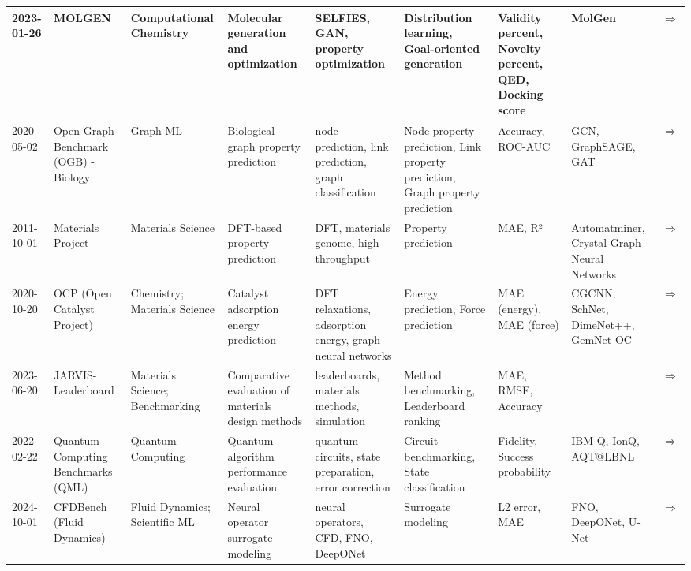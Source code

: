 \documentclass{article}
\begin{document}
\begin{landscape}
{\begin{longtable}{|p{1.5cm}|p{2.5cm}|p{2cm}|p{2cm}|p{2.5cm}|p{3cm}|p{2cm}|p{2cm}|p{1cm}|}
2023-01-26 & MOLGEN & Computational Chemistry & Molecular generation and optimization & SELFIES, GAN, property optimization & Distribution learning, Goal-oriented generation & Validity percent, Novelty percent, QED, Docking score & MolGen & \cite{fang2023domain} \href{https://arxiv.org/abs/2301.11259}{$\Rightarrow$ } \\ \hline
2020-05-02 & Open Graph Benchmark (OGB) - Biology & Graph ML & Biological graph property prediction & node prediction, link prediction, graph classification & Node property prediction, Link property prediction, Graph property prediction & Accuracy, ROC-AUC & GCN, GraphSAGE, GAT & \cite{hu2020ogb} \href{https://arxiv.org/abs/2005.00687}{$\Rightarrow$ } \\ \hline
2011-10-01 & Materials Project & Materials Science & DFT-based property prediction & DFT, materials genome, high-throughput & Property prediction & MAE, R² & Automatminer, Crystal Graph Neural Networks & \cite{jain2013materials} \href{https://materialsproject.org/}{$\Rightarrow$ } \\ \hline
2020-10-20 & OCP (Open Catalyst Project) & Chemistry; Materials Science & Catalyst adsorption energy prediction & DFT relaxations, adsorption energy, graph neural networks & Energy prediction, Force prediction & MAE (energy), MAE (force) & CGCNN, SchNet, DimeNet++, GemNet-OC & \cite{chanussot2021oc20, tran2023oc22, doi:10.1021/acscatal.0c04525, tran2023b} \href{https://pubs.acs.org/doi/10.1021/acscatal.0c04525}{$\Rightarrow$ } \\ \hline
2023-06-20 & JARVIS-Leaderboard & Materials Science; Benchmarking & Comparative evaluation of materials design methods & leaderboards, materials methods, simulation & Method benchmarking, Leaderboard ranking & MAE, RMSE, Accuracy &  & \cite{choudhary2024jarvis} \href{https://doi.org/10.1038/s41524-024-01259-w}{$\Rightarrow$ } \\ \hline
2022-02-22 & Quantum Computing Benchmarks (QML) & Quantum Computing & Quantum algorithm performance evaluation & quantum circuits, state preparation, error correction & Circuit benchmarking, State classification & Fidelity, Success probability & IBM Q, IonQ, AQT@LBNL & \cite{kiwit2023} \href{http://dx.doi.org/10.1109/QCE57702.2023.00061}{$\Rightarrow$ } \\ \hline
2024-10-01 & CFDBench (Fluid Dynamics) & Fluid Dynamics; Scientific ML & Neural operator surrogate modeling & neural operators, CFD, FNO, DeepONet & Surrogate modeling & L2 error, MAE & FNO, DeepONet, U-Net & \cite{luo2024cfdbenchlargescalebenchmarkmachine} \href{https://arxiv.org/abs/2310.05963}{$\Rightarrow$ } \\ \hline

\end{longtable}}
\end{landscape}
\end{document}
